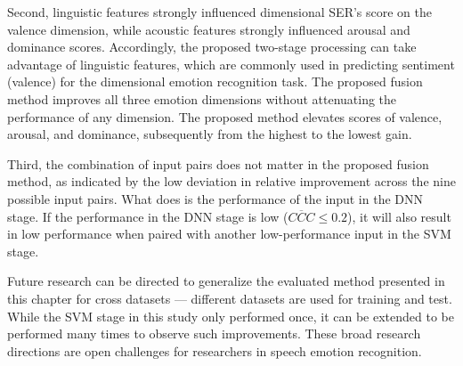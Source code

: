 Second, linguistic features strongly influenced dimensional SER's score on the
valence dimension, while acoustic features strongly influenced arousal and
dominance scores. Accordingly, the proposed two-stage processing can take
advantage of linguistic features, which are commonly used in predicting
sentiment (valence) for the dimensional emotion recognition task. The proposed
fusion method improves all three emotion dimensions without attenuating the
performance of any dimension. The proposed method elevates scores of valence,
arousal, and dominance, subsequently from the highest to the lowest gain.

Third, the combination of input pairs does not matter in the proposed fusion
method, as indicated by the low deviation in relative improvement across the
nine possible input pairs. What does is the performance of the input in
the DNN stage. If the performance in the DNN stage is low
($\overline{CCC} \leq 0.2$), it will also result in low performance when paired
with another low-performance input in the SVM stage.

Future research can be directed to generalize the evaluated method presented in
this chapter for cross datasets --- different datasets are used for training and
test. While the SVM stage in this study only performed once, it can be extended
to be performed many times to observe such improvements. These broad research
directions are open challenges for researchers in speech emotion recognition.



